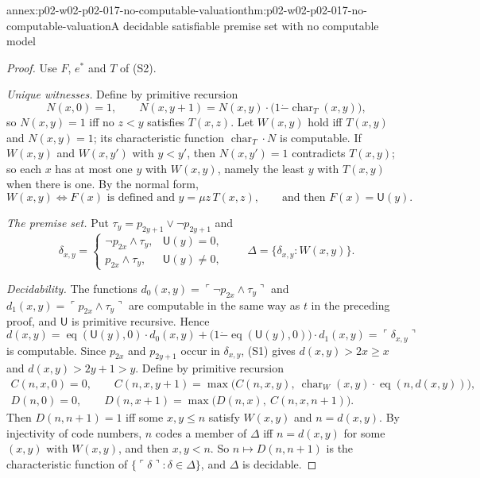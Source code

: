 \begin{annexitem}{annex:p02-w02-p02-017-no-computable-valuation}{thm:p02-w02-p02-017-no-computable-valuation}{A decidable satisfiable premise set with no computable model}
\begin{proof}
Use \(F\), \(e^{*}\) and \(T\) of (S2).

\emph{Unique witnesses.}  Define by primitive recursion
\[
 N(x,0)=1,\qquad
 N(x,y+1)=N(x,y)\cdot\bigl(1\mathbin{\dot{-}}\operatorname{char}_T(x,y)\bigr),
\]
so \(N(x,y)=1\) iff no \(z<y\) satisfies \(T(x,z)\).  Let \(W(x,y)\) hold
iff \(T(x,y)\) and \(N(x,y)=1\); its characteristic function
\(\operatorname{char}_T\cdot N\) is computable.  If \(W(x,y)\) and
\(W(x,y')\) with \(y<y'\), then \(N(x,y')=1\) contradicts \(T(x,y)\); so
each \(x\) has at most one \(y\) with \(W(x,y)\), namely the least \(y\)
with \(T(x,y)\) when there is one.  By the normal form,
\begin{equation}
 W(x,y)\iff F(x)\text{ is defined and }y=\mu z\,T(x,z),
 \qquad\text{and then } F(x)=\mathsf U(y).
 \tag{S3}
\end{equation}

\emph{The premise set.}  Put \(\tau_y=p_{2y+1}\lor\neg p_{2y+1}\) and
\[
 \delta_{x,y}=
 \begin{cases}
  \neg p_{2x}\land\tau_y, & \mathsf U(y)=0,\\
  p_{2x}\land\tau_y, & \mathsf U(y)\ne0,
 \end{cases}
 \qquad
 \Delta=\{\delta_{x,y}:W(x,y)\}.
\]

\emph{Decidability.}  The functions
\(d_0(x,y)=\ulcorner\neg p_{2x}\land\tau_y\urcorner\) and
\(d_1(x,y)=\ulcorner p_{2x}\land\tau_y\urcorner\) are computable in the
same way as \(t\) in the preceding proof, and \(\mathsf U\) is primitive
recursive.  Hence
\[
 d(x,y)=\operatorname{eq}(\mathsf U(y),0)\cdot d_0(x,y)
 +\bigl(1\mathbin{\dot{-}}\operatorname{eq}(\mathsf U(y),0)\bigr)\cdot d_1(x,y)
 =\ulcorner\delta_{x,y}\urcorner
\]
is computable.  Since \(p_{2x}\) and \(p_{2y+1}\) occur in
\(\delta_{x,y}\), (S1) gives
\(d(x,y)>2x\ge x\) and \(d(x,y)>2y+1>y\).  Define by primitive recursion
\[
\begin{gathered}
 C(n,x,0)=0,\qquad
 C(n,x,y+1)=\max\bigl(C(n,x,y),\
   \operatorname{char}_W(x,y)\cdot\operatorname{eq}(n,d(x,y))\bigr),\\
 D(n,0)=0,\qquad
 D(n,x+1)=\max\bigl(D(n,x),\ C(n,x,n+1)\bigr).
\end{gathered}
\]
Then \(D(n,n+1)=1\) iff some \(x,y\le n\) satisfy \(W(x,y)\) and
\(n=d(x,y)\).  By injectivity of code numbers, \(n\) codes a member of
\(\Delta\) iff \(n=d(x,y)\) for some \((x,y)\) with \(W(x,y)\), and then
\(x,y<n\).  So \(n\mapsto D(n,n+1)\) is the characteristic function of
\(\{\ulcorner\delta\urcorner:\delta\in\Delta\}\), and \(\Delta\) is
decidable.


\end{proof}
\end{annexitem}
